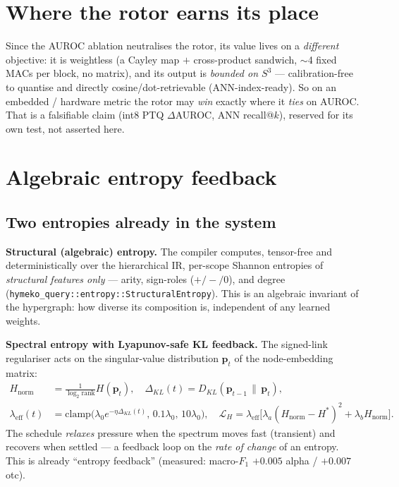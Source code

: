 \documentclass[11pt, a4paper]{article}
\begin{document}
\section{Where the rotor earns its place}
Since the AUROC ablation neutralises the rotor, its value lives on a \emph{different}
objective: it is weightless (a Cayley map $+$ cross-product sandwich, $\sim$4 fixed MACs
per block, no matrix), and its output is \emph{bounded on $S^3$} --- calibration-free to
quantise and directly cosine/dot-retrievable (ANN-index-ready). So on an embedded /
hardware metric the rotor may \emph{win} exactly where it \emph{ties} on AUROC. That is a
falsifiable claim (int8 PTQ $\Delta$AUROC, ANN recall@$k$), reserved for its own test, not
asserted here.

\section{Algebraic entropy feedback}
\subsection{Two entropies already in the system}
\textbf{Structural (algebraic) entropy.} The compiler computes, tensor-free and
deterministically over the hierarchical IR, per-scope Shannon entropies of
\emph{structural features only} --- arity, sign-roles ($+/-/0$), and degree
(\texttt{hymeko\_query::entropy::StructuralEntropy}). This is an algebraic invariant of
the hypergraph: how diverse its composition is, independent of any learned weights.

\textbf{Spectral entropy with Lyapunov-safe KL feedback.} The signed-link regulariser
acts on the singular-value distribution $\mathbf{p}_t$ of the node-embedding matrix:
\begin{align*}
H_{\mathrm{norm}} &= \tfrac{1}{\log_2\mathrm{rank}} H(\mathbf{p}_t), \quad
\Delta_{KL}(t) = D_{KL}(\mathbf{p}_{t-1}\,\|\,\mathbf{p}_t), \\
\lambda_{\mathrm{eff}}(t) &= \mathrm{clamp}\!\bigl(\lambda_0 e^{-\eta\Delta_{KL}(t)},\,
0.1\lambda_0,\, 10\lambda_0\bigr), \quad
\mathcal{L}_H = \lambda_{\mathrm{eff}}\bigl[\lambda_a(H_{\mathrm{norm}}-H^\ast)^2
+ \lambda_b H_{\mathrm{norm}}\bigr].
\end{align*}
The schedule \emph{relaxes} pressure when the spectrum moves fast (transient) and recovers
when settled --- a feedback loop on the \emph{rate of change} of an entropy. This is
already ``entropy feedback'' (measured: macro-$F_1$ $+0.005$ alpha / $+0.007$ otc).
\end{document}
